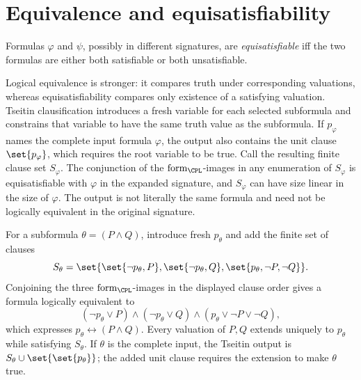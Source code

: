 \section{Equivalence and equisatisfiability}
\label{sec:automated-reasoning-02}

\begin{definition}[Equisatisfiability]
Formulas \(\varphi\) and \(\psi\), possibly in different signatures, are
\emph{equisatisfiable} iff the two formulas are either both satisfiable
or both unsatisfiable.
\end{definition}

Logical equivalence is stronger: it compares truth under corresponding
valuations, whereas equisatisfiability compares only existence of a satisfying
valuation.  Tseitin clausification \cite{Tseitin1968} introduces a fresh
variable for each
selected subformula and constrains that variable to have the same truth value
as the subformula.  If \(p_\varphi\) names the complete input formula
\(\varphi\), the output also contains the unit clause \(\set{p_\varphi}\),
which requires the root variable to be true.  Call the resulting finite clause
set \(S_\varphi\).  The conjunction of the
\(\operatorname{form}_{\CPL}\)-images in any enumeration of
\(S_\varphi\) is equisatisfiable with \(\varphi\) in the expanded signature,
and
\(S_\varphi\) can have size linear in the size of \(\varphi\).  The output is
not literally the same formula and need not be logically equivalent in the
original signature.

\begin{example}
For a subformula \(\theta=(P\land Q)\), introduce fresh \(p_\theta\) and add
the finite set of clauses
\[
  S_\theta=
  \set{
    \set{\neg p_\theta,P},
    \set{\neg p_\theta,Q},
    \set{p_\theta,\neg P,\neg Q}
  }.
\]
Conjoining the three \(\operatorname{form}_{\CPL}\)-images in the displayed
clause order gives a formula logically equivalent to
\[
  (\neg p_\theta\lor P)\land
  (\neg p_\theta\lor Q)\land
  (p_\theta\lor\neg P\lor\neg Q),
\]
which expresses \(p_\theta\leftrightarrow(P\land Q)\).
Every valuation of \(P,Q\) extends uniquely to \(p_\theta\) while satisfying
\(S_\theta\).  If \(\theta\) is the complete input, the Tseitin output is
\(S_\theta\cup\set{\set{p_\theta}}\); the added unit clause requires the
extension to make \(\theta\) true.
\end{example}

